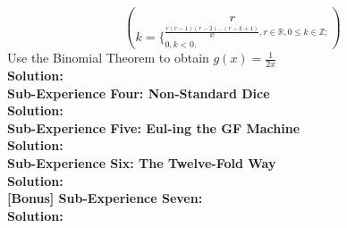 \documentclass[10pt,a4paper]{report}
\begin{document}
	\[ {r}\choose{k} = \lbrace_{0, k<0.}^{\frac{r(r-1)(r-2)...(r-k+1)}{k!}, r \in \mathbb{R},0\leq k \in \mathbb{Z};}   \]
	Use the Binomial Theorem to obtain $g(x) = \frac{1}{2x}$\\
	\textbf{Solution: }\\
	\newline
	\textbf{Sub-Experience Four: Non-Standard Dice}\\
	\textbf{Solution: }\\
	\newline
	\textbf{Sub-Experience Five: Eul-ing the GF Machine}\\
	\textbf{Solution: }\\
	\newline
	\textbf{Sub-Experience Six: The Twelve-Fold Way}\\
	\textbf{Solution: }\\
	\newline
	\textbf{[Bonus] Sub-Experience Seven:}\\	
	\textbf{Solution: }\\
	\newline
\end{document}
